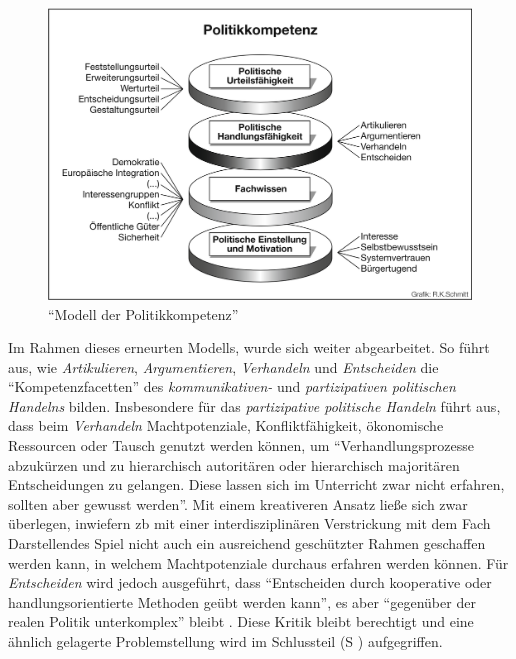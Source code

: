 \begin{figure}[htb]
    \centering
    \includegraphics[width=1\linewidth]{Detjen et al. 2012 p. 15.png}
    \caption{\enquote{Modell der Politikkompetenz} \autocite[15]{Detjen.2012}}
    \label{2012kompMod}
\end{figure}

Im Rahmen dieses erneurten Modells, wurde sich weiter abgearbeitet. So führt \textcite[27]{Massing2012} aus, wie \emph{Artikulieren}, \emph{Argumentieren}, \emph{Verhandeln} und \emph{Entscheiden} die \enquote{Kompetenzfacetten} des \emph{kommunikativen-} und \emph{partizipativen politischen Handelns} bilden. 
Insbesondere für das \emph{partizipative politische Handeln} führt \textcite[27]{Massing2012} aus, dass beim \emph{Verhandeln} Machtpotenziale, Konfliktfähigkeit, ökonomische Ressourcen oder Tausch genutzt werden können, um \enquote{Verhandlungsprozesse abzukürzen und zu hierarchisch autoritären oder hierarchisch majoritären Entscheidungen zu gelangen. Diese lassen sich im Unterricht zwar nicht erfahren, sollten aber gewusst werden}. 
Mit einem kreativeren Ansatz ließe sich zwar überlegen, inwiefern \gls{zb} mit einer interdisziplinären Verstrickung mit dem Fach Darstellendes Spiel nicht auch ein ausreichend geschützter Rahmen geschaffen werden kann, in welchem Machtpotenziale durchaus erfahren werden können. Für \emph{Entscheiden} wird jedoch ausgeführt, dass \enquote{Entscheiden durch kooperative oder handlungsorientierte Methoden geübt werden kann}, es aber \enquote{gegenüber der realen Politik unterkomplex} bleibt \autocite[27]{Massing2012}. Diese Kritik bleibt berechtigt und eine ähnlich gelagerte Problemstellung wird im Schlussteil (\gls{S} \pageref{fakePartizipation}) aufgegriffen. 


